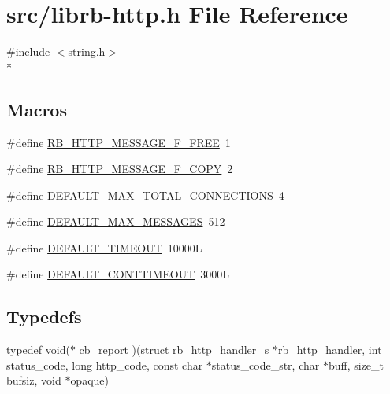 \hypertarget{librb-http_8h}{\section{src/librb-\/http.h File Reference}
\label{librb-http_8h}
}
{\ttfamily \#include $<$string.\-h$>$}\\*
\subsection*{Macros}
\begin{DoxyCompactItemize}
\item 
\#define \hyperlink{librb-http_8h_aef79f44f520e54cbedce1068fe324720}{R\-B\-\_\-\-H\-T\-T\-P\-\_\-\-M\-E\-S\-S\-A\-G\-E\-\_\-\-F\-\_\-\-F\-R\-E\-E}~1
\item 
\#define \hyperlink{librb-http_8h_a0ffdecd586e5dc8f1eeede6bac9bc19f}{R\-B\-\_\-\-H\-T\-T\-P\-\_\-\-M\-E\-S\-S\-A\-G\-E\-\_\-\-F\-\_\-\-C\-O\-P\-Y}~2
\item 
\#define \hyperlink{librb-http_8h_a21474916371fa38cf4ac2bcd1701ccce}{D\-E\-F\-A\-U\-L\-T\-\_\-\-M\-A\-X\-\_\-\-T\-O\-T\-A\-L\-\_\-\-C\-O\-N\-N\-E\-C\-T\-I\-O\-N\-S}~4
\item 
\#define \hyperlink{librb-http_8h_acbcaf1a46da1c8312a9216fecae74458}{D\-E\-F\-A\-U\-L\-T\-\_\-\-M\-A\-X\-\_\-\-M\-E\-S\-S\-A\-G\-E\-S}~512
\item 
\#define \hyperlink{librb-http_8h_aad2dd72565852b91c809cd4685833b17}{D\-E\-F\-A\-U\-L\-T\-\_\-\-T\-I\-M\-E\-O\-U\-T}~10000\-L
\item 
\#define \hyperlink{librb-http_8h_a74cf0c869a3e674e0b8a522ee4b05490}{D\-E\-F\-A\-U\-L\-T\-\_\-\-C\-O\-N\-T\-T\-I\-M\-E\-O\-U\-T}~3000\-L
\end{DoxyCompactItemize}
\subsection*{Typedefs}
\begin{DoxyCompactItemize}
\item 
typedef void($\ast$ \hyperlink{librb-http_8h_abcf27caf85ec3ac2b11d1b89aed63966}{cb\-\_\-report} )(struct \hyperlink{structrb__http__handler__s}{rb\-\_\-http\-\_\-handler\-\_\-s} $\ast$rb\-\_\-http\-\_\-handler, int status\-\_\-code, long http\-\_\-code, const char $\ast$status\-\_\-code\-\_\-str, char $\ast$buff, size\-\_\-t bufsiz, void $\ast$opaque)
\end{DoxyCompactItemize}
